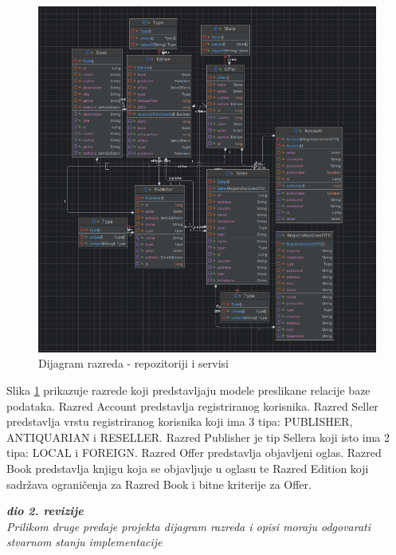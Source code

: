 			\begin{figure}[H]
				\includegraphics[scale=0.4]{slike/DijagramRazreda-RepozitorijiServisi.png} %
				\centering
				\caption{Dijagram razreda - repozitoriji i servisi}
				\label{fig:DijRaz - RepServ}
			\end{figure}
			
			Slika \ref{fig:DijRaz - RepServ} prikazuje razrede koji predstavljaju modele preslikane relacije baze podataka. Razred Account predstavlja registriranog korisnika. Razred Seller predstavlja vrstu registriranog korisnika koji ima 3 tipa: PUBLISHER, ANTIQUARIAN i RESELLER.  Razred Publisher je tip Sellera koji isto ima 2 tipa: LOCAL i FOREIGN. Razred Offer predstavlja objavljeni oglas. Razred Book predstavlja knjigu koja se objavljuje u oglasu te Razred Edition koji sadržava ograničenja za Razred Book i bitne kriterije za Offer.
		
			
			\textbf{\textit{dio 2. revizije}}\\			
			
			\textit{Prilikom druge predaje projekta dijagram razreda i opisi moraju odgovarati stvarnom stanju implementacije}
			
			
			
			\eject
		
